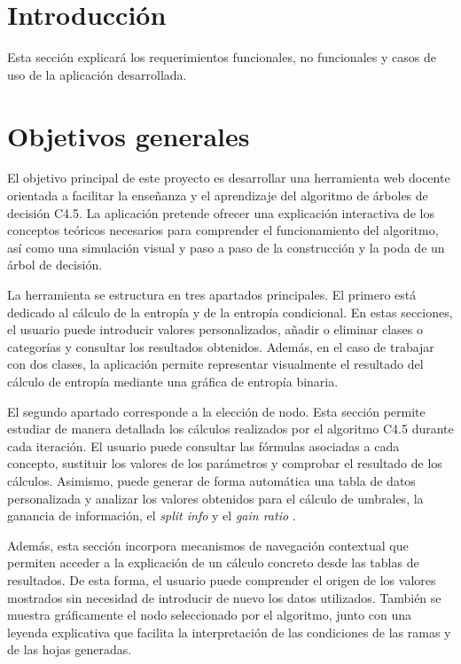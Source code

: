 
\section{Introducción}

Esta sección explicará los requerimientos funcionales, no funcionales y casos de uso de la aplicación desarrollada.

\section{Objetivos generales}

El objetivo principal de este proyecto es desarrollar una herramienta web docente orientada a facilitar la enseñanza y el aprendizaje del algoritmo de árboles de decisión C4.5. La aplicación pretende ofrecer una explicación interactiva de los conceptos teóricos necesarios para comprender el funcionamiento del algoritmo, así como una simulación visual y paso a paso de la construcción y la poda de un árbol de decisión.

La herramienta se estructura en tres apartados principales. El primero está dedicado al cálculo de la entropía y de la entropía condicional. En estas secciones, el usuario puede introducir valores personalizados, añadir o eliminar clases o categorías y consultar los resultados obtenidos. Además, en el caso de trabajar con dos clases, la aplicación permite representar visualmente el resultado del cálculo de entropía mediante una gráfica de entropía binaria.

El segundo apartado corresponde a la elección de nodo. Esta sección permite estudiar de manera detallada los cálculos realizados por el algoritmo C4.5 durante cada iteración. El usuario puede consultar las fórmulas asociadas a cada concepto, sustituir los valores de los parámetros y comprobar el resultado de los cálculos. Asimismo, puede generar de forma automática una tabla de datos personalizada y analizar los valores obtenidos para el cálculo de umbrales, la ganancia de información, el \textit{split info} y el \textit{gain ratio} .

Además, esta sección incorpora mecanismos de navegación contextual que permiten acceder a la explicación de un cálculo concreto desde las tablas de resultados. De esta forma, el usuario puede comprender el origen de los valores mostrados sin necesidad de introducir de nuevo los datos utilizados. También se muestra gráficamente el nodo seleccionado por el algoritmo, junto con una leyenda explicativa que facilita la interpretación de las condiciones de las ramas y de las hojas generadas.

